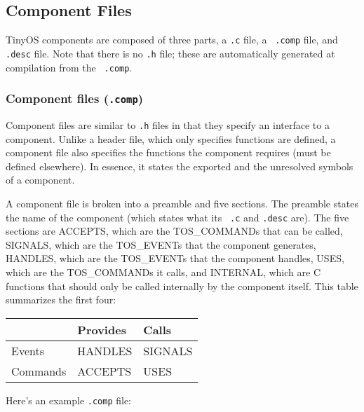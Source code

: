 \documentclass[12pt]{article}
\begin{document}
\subsection*{Component Files}

TinyOS components are composed of three parts, a {\tt .c} file, a {\tt
.comp} file, and {\tt .desc} file. Note that there is no {\tt .h}
file; these are automatically generated at compilation from the {\tt
.comp}.

\subsubsection*{Component files ({\tt .comp})}

Component files are similar to {\tt .h} files in that they specify an
interface to a component. Unlike a header file, which only specifies
functions are defined, a component file also specifies the functions
the component requires (must be defined elsewhere). In essence, it
states the exported and the unresolved symbols of a component.

A component file is broken into a preamble and five sections. The
preamble states the name of the component (which states what its {\tt
.c} and {\tt .desc} are). The five sections are ACCEPTS, which are the
TOS\_COMMANDs that can be called, SIGNALS, which are the TOS\_EVENTs
that the component generates, HANDLES, which are the TOS\_EVENTs that
the component handles, USES, which are the TOS\_COMMANDs it calls, and
INTERNAL, which are C functions that should only be called internally
by the component itself. This table summarizes the first four:

\vspace{0.3in}

\begin{tabular}{|l||l|l|} \hline
& Provides& Calls \\ \hline \hline
Events & HANDLES & SIGNALS \\ \hline
Commands & ACCEPTS & USES \\ \hline
\end{tabular}

\vspace{0.3in}

Here's an example {\tt .comp} file:
\end{document}
